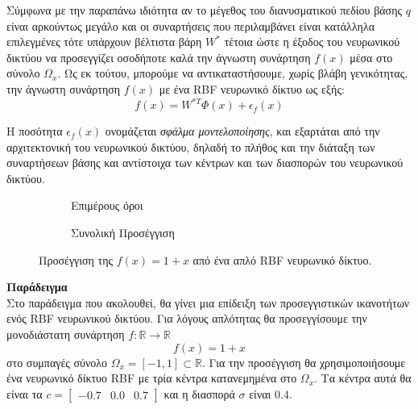 Σύμφωνα με την παραπάνω ιδιότητα αν το μέγεθος του διανυσματικού πεδίου βάσης $q$ είναι αρκούντως μεγάλο και οι συναρτήσεις που περιλαμβάνει είναι κατάλληλα επιλεγμένες τότε υπάρχουν βέλτιστα βάρη $W^*$ τέτοια ώστε η έξοδος του νευρωνικού δικτύου να προσεγγίζει οσοδήποτε καλά την άγνωστη συνάρτηση $f(x)$ μέσα στο σύνολο $\Omega_x$. Ως εκ τούτου, μπορούμε να αντικαταστήσουμε, χωρίς βλάβη γενικότητας, την άγνωστη συνάρτηση $f(x)$ με ένα RBF νευρωνικό δίκτυο ως εξής:
\begin{equation*}
	f(x) = W^{*T}\varPhi(x) + \epsilon_f(x)
\end{equation*}

Η ποσότητα $\epsilon_f(x)$ ονομάζεται \textit{σφάλμα μοντελοποίησης}, και εξαρτάται από την αρχιτεκτονική του νευρωνικού δικτύου, δηλαδή το πλήθος και την διάταξη των συναρτήσεων βάσης και αντίστοιχα των κέντρων και των διασπορών του νευρωνικού δικτύου.

\begin{figure}
	\begin{subfigure}{0.5\textwidth}
		
		\caption{Επιμέρους όροι}
	\end{subfigure}
	\begin{subfigure}{0.5\textwidth}
		
		\caption{Συνολική Προσέγγιση}
	\end{subfigure}
	\caption{ Προσέγγιση της $f(x) = 1+x$ από ένα απλό RBF νευρωνικό δίκτυο. }
	\label{fig:rbf_approximation}
\end{figure}


\textbf{Παράδειγμα}\\
Στο παράδειγμα που ακολουθεί, θα γίνει μια επίδειξη των προσεγγιστικών ικανοτήτων ενός RBF νευρωνικού δικτύου. Για λόγους απλότητας θα προσεγγίσουμε την μονοδιάστατη συνάρτηση $f: \mathbb{R} \rightarrow \mathbb{R} $
\begin{equation*}
f(x) = 1+x
\end{equation*}
στο συμπαγές σύνολο $\Omega_x = [-1,1] \subset \mathbb{R}$. Για την προσέγγιση θα χρησιμοποιήσουμε ένα νευρωνικό δίκτυο RBF με τρία κέντρα κατανεμημένα στο $\Omega_x$. Τα κέντρα αυτά θα είναι τα $c = \begin{bmatrix} -0.7 & 0.0 & 0.7 \end{bmatrix}$ και η διασπορά $\sigma$ είναι $0.4$. 

